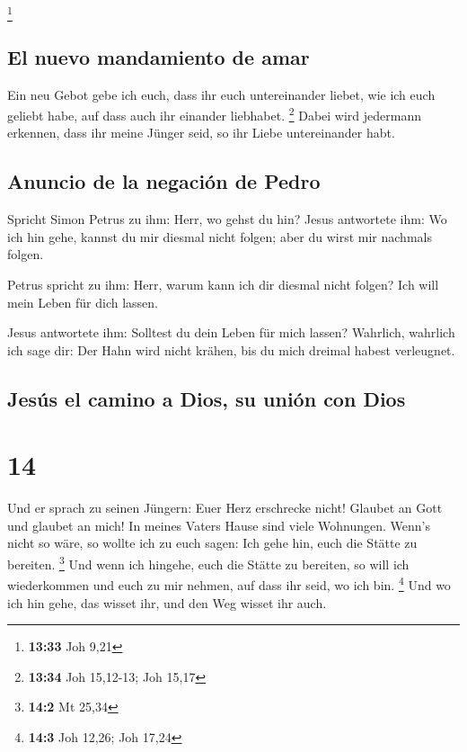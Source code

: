 \footnote{\textbf{13:33} Joh 9,21}

\hypertarget{el-nuevo-mandamiento-de-amar}{%
\subsection{El nuevo mandamiento de
amar}\label{el-nuevo-mandamiento-de-amar}}

 Ein neu Gebot gebe ich euch, dass ihr euch untereinander
liebet, wie ich euch geliebt habe, auf dass auch ihr einander liebhabet.
\footnote{\textbf{13:34} Joh 15,12-13; Joh 15,17}  Dabei
wird jedermann erkennen, dass ihr meine Jünger seid, so ihr Liebe
untereinander habt.

\hypertarget{anuncio-de-la-negaciuxf3n-de-pedro}{%
\subsection{Anuncio de la negación de
Pedro}\label{anuncio-de-la-negaciuxf3n-de-pedro}}

 Spricht Simon Petrus zu ihm: Herr, wo gehst du hin?
Jesus antwortete ihm: Wo ich hin gehe, kannst du mir diesmal nicht
folgen; aber du wirst mir nachmals folgen.

 Petrus spricht zu ihm: Herr, warum kann ich dir diesmal
nicht folgen? Ich will mein Leben für dich lassen.

 Jesus antwortete ihm: Solltest du dein Leben für mich
lassen? Wahrlich, wahrlich ich sage dir: Der Hahn wird nicht krähen, bis
du mich dreimal habest verleugnet.

\hypertarget{jesuxfas-el-camino-a-dios-su-uniuxf3n-con-dios}{%
\subsection{Jesús el camino a Dios, su unión con
Dios}\label{jesuxfas-el-camino-a-dios-su-uniuxf3n-con-dios}}

\hypertarget{section-13}{%
\section{14}\label{section-13}}

 Und er sprach zu seinen Jüngern: Euer Herz erschrecke
nicht! Glaubet an Gott und glaubet an mich!  In meines
Vaters Hause sind viele Wohnungen. Wenn's nicht so wäre, so wollte ich
zu euch sagen: Ich gehe hin, euch die Stätte zu bereiten. \footnote{\textbf{14:2}
  Mt 25,34}  Und wenn ich hingehe, euch die Stätte zu
bereiten, so will ich wiederkommen und euch zu mir nehmen, auf dass ihr
seid, wo ich bin. \footnote{\textbf{14:3} Joh 12,26; Joh 17,24}
 Und wo ich hin gehe, das wisset ihr, und den Weg wisset
ihr auch.

